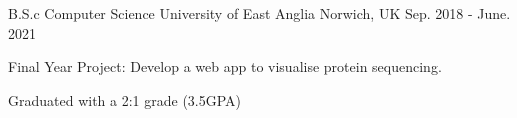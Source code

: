 

\begin{cventries}

    \cventry
    {B.S.c Computer Science} %
    {University of East Anglia} %
    {Norwich, UK} %
    {Sep. 2018 - June. 2021} %
    {
        \begin{cvitems} %
            \item {Final Year Project: Develop a web app to visualise protein sequencing.}
            \item {Graduated with a 2:1 grade (3.5GPA)}
        \end{cvitems}
    }

\end{cventries}
